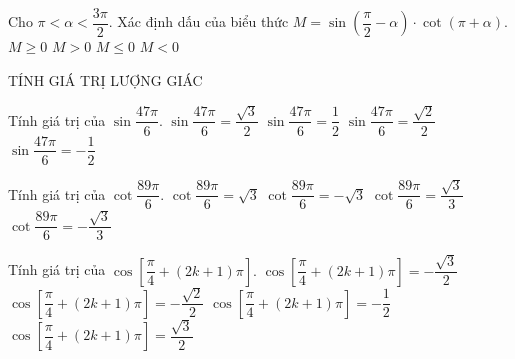 \begin{ex}%
Cho $\pi <\alpha <\dfrac{{3\pi}}{2}$. Xác định dấu của biểu thức $M=\sin \left({\dfrac{\pi}{2}-\alpha}\right)\cdot \cot \left({\pi+\alpha}\right).$
\choice
{$M\geqslant 0$}
{$M>0$}
{$M\leqslant 0$}
{\True $M<0$}
\end{ex}

\begin{dang}
    {TÍNH GIÁ TRỊ LƯỢNG GIÁC}
\end{dang}

\begin{ex}%
Tính giá trị của $\sin \dfrac{{47\pi}}{6}.$
\choice
{$\sin \dfrac{{47\pi}}{6}=\dfrac{{\sqrt{3}}}{2}$}
{$\sin \dfrac{{47\pi}}{6}=\dfrac{1}{2}$}
{$\sin \dfrac{{47\pi}}{6}=\dfrac{{\sqrt{2}}}{2}$}
{\True $\sin \dfrac{{47\pi}}{6}=-\dfrac{1}{2}$}
\end{ex}

\begin{ex}%
Tính giá trị của $\cot \dfrac{{89\pi}}{6}.$
\choice
{$\cot \dfrac{{89\pi}}{6}=\sqrt{3}$}
{\True $\cot \dfrac{{89\pi}}{6}=-\sqrt{3}$}
{$\cot \dfrac{{89\pi}}{6}=\dfrac{{\sqrt{3}}}{3}$}
{$\cot \dfrac{{89\pi}}{6}=-\dfrac{{\sqrt{3}}}{3}$}
\end{ex}

\begin{ex}%
Tính giá trị của $\cos \left[{\dfrac{\pi}{4}+\left({2k+1}\right)\pi}\right].$
\choice
{$\cos \left[{\dfrac{\pi}{4}+\left({2k+1}\right)\pi}\right]=-\dfrac{{\sqrt{3}}}{2}$}
{\True $\cos \left[{\dfrac{\pi}{4}+\left({2k+1}\right)\pi}\right]=-\dfrac{{\sqrt{2}}}{2}$}
{$\cos \left[{\dfrac{\pi}{4}+\left({2k+1}\right)\pi}\right]=-\dfrac{1}{2}$}
{$\cos \left[{\dfrac{\pi}{4}+\left({2k+1}\right)\pi}\right]=\dfrac{{\sqrt{3}}}{2}$}
\end{ex}


